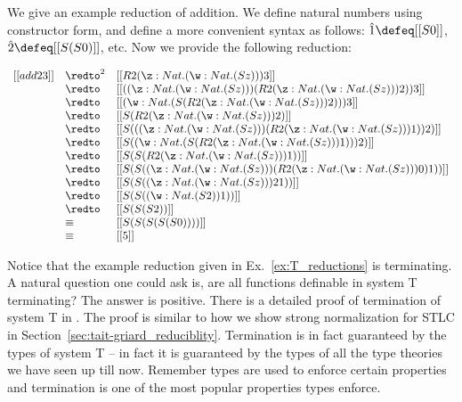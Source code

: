 \begin{example}
  \label{ex:T_reductions}
  We give an example reduction of addition.  We define 
  natural numbers using constructor
  form, and define a more convenient syntax 
  as follows:  
  $\hat{1} \defeq [[S 0]]$, $\hat{2} \defeq [[S (S 0)]]$, etc.  Now we provide the following
  reduction:
  \begin{center}
    \vspace{39px}
    \begin{math}      
      \begin{array}{lll}
        [[add 2 3]] & \redto^2 &  [[R 2 (\z:Nat.(\w:Nat.(S z))) 3]]\\
             & \redto   & [[((\z:Nat.(\w:Nat.(S z))) (R 2 (\z:Nat.(\w:Nat.(S z))) 2)) 3]]\\
             & \redto   & [[(\w:Nat.(S (R 2 (\z:Nat.(\w:Nat.(S z))) 2))) 3]]\\
             & \redto   & [[S (R 2 (\z:Nat.(\w:Nat.(S z))) 2)]]\\
             & \redto   & [[S (((\z:Nat.(\w:Nat.(S z))) (R 2 (\z:Nat.(\w:Nat.(S z))) 1)) 2)]]\\
             & \redto   & [[S ((\w:Nat.(S (R 2 (\z:Nat.(\w:Nat.(S z))) 1))) 2)]]\\
             & \redto   & [[S (S (R 2 (\z:Nat.(\w:Nat.(S z))) 1))]]\\
             & \redto   & [[S (S ((\z:Nat.(\w:Nat.(S z))) (R 2 (\z:Nat.(\w:Nat.(S z))) 0) 1))]]\\
             & \redto   & [[S (S ((\z:Nat.(\w:Nat.(S z))) 2 1))]]\\
             & \redto   & [[S (S ((\w:Nat.(S 2)) 1))]]\\
             & \redto   & [[S (S (S 2))]] \\
             & \equiv   & [[S (S (S (S (S 0))))]] \\
             & \equiv   & [[5]]
      \end{array}
    \end{math}
  \end{center}
\end{example}

Notice that the example reduction given in Ex.~\ref{ex:T_reductions}
is terminating.  A natural question one could ask is, are all
functions definable in system T terminating?  The answer is positive.
There is a detailed proof of termination of system T in
\cite{Girard:1989}.  The proof is similar to how we show strong
normalization for STLC in
Section~\ref{sec:tait-griard_reduciblity}. Termination is in fact
guaranteed by the types of system T -- in fact it is guaranteed by the
types of all the type theories we have seen up till now.  Remember
types are used to enforce certain properties and termination is one of
the most popular properties types enforce.
